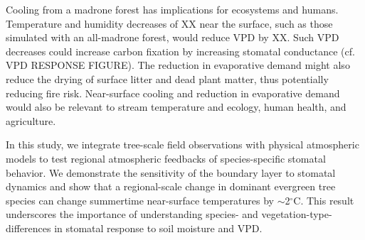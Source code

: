 Cooling from a madrone forest has implications for ecosystems and humans.  Temperature and humidity decreases of XX near the surface, such as those simulated with an all-madrone forest, would reduce VPD by XX.  Such VPD decreases could increase carbon fixation by increasing stomatal conductance (cf. VPD RESPONSE FIGURE).  The reduction in evaporative demand might also reduce the drying of surface litter and dead plant matter, thus potentially reducing fire risk.  Near-surface cooling and reduction in evaporative demand would also be relevant to stream temperature and ecology, human health, and agriculture.

In this study, we integrate tree-scale field observations with physical atmospheric models to test regional atmospheric feedbacks of species-specific stomatal behavior.  We demonstrate the sensitivity of the boundary layer to stomatal dynamics and show that a regional-scale change in dominant evergreen tree species can change summertime near-surface temperatures by $\sim$2$^\circ$C.  This result underscores the importance of understanding species- and vegetation-type-differences in stomatal response to soil moisture and VPD.

